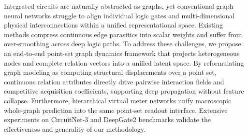 Integrated circuits are naturally abstracted as graphs, yet conventional graph neural networks struggle to align individual logic gates and multi-dimensional physical interconnections within a unified representational space. Existing methods compress continuous edge parasitics into scalar weights and suffer from over-smoothing across deep logic paths. To address these challenges, we propose an end-to-end point-set graph dynamics framework that projects heterogeneous nodes and complete relation vectors into a unified latent space. By reformulating graph modeling as computing structural displacements over a point set, continuous relation attributes directly drive pairwise interaction fields and competitive acquisition coefficients, supporting deep propagation without feature collapse. Furthermore, hierarchical virtual meter networks unify macroscopic whole-graph prediction into the same point-set readout interface. Extensive experiments on CircuitNet-3 and DeepGate2 benchmarks validate the effectiveness and generality of our methodology.
